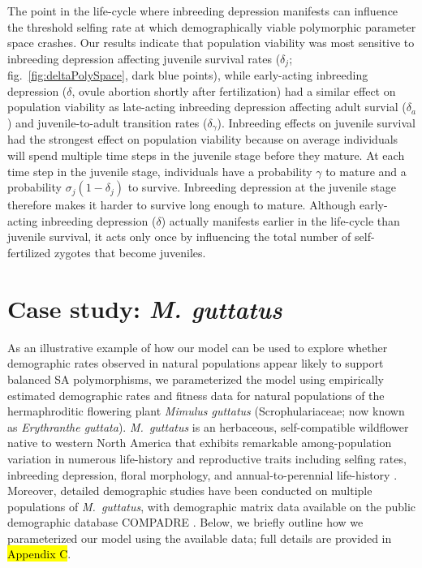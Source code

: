 \documentclass[11pt]{article}
\begin{document}
The point in the life-cycle where inbreeding depression manifests can influence the threshold selfing rate at which demographically viable polymorphic parameter space crashes. Our results indicate that population viability was most sensitive to inbreeding depression affecting juvenile survival rates ($\delta_j$; fig.~\ref{fig:deltaPolySpace}, dark blue points), while early-acting inbreeding depression ($\delta$, ovule abortion shortly after fertilization) had a similar effect on population viability as late-acting inbreeding depression affecting adult survial ($\delta_a$) and juvenile-to-adult transition rates ($\delta_{\gamma}$). Inbreeding effects on juvenile survival had the strongest effect on population viability because on average individuals will spend multiple time steps in the juvenile stage before they mature. At each time step in the juvenile stage, individuals have a probability $\gamma$ to mature and a probability $\sigma_j(1-\delta_j)$ to survive. Inbreeding depression at the juvenile stage therefore makes it harder to survive long enough to mature. Although early-acting inbreeding depression ($\delta$) actually manifests earlier in the life-cycle than juvenile survival, it acts only once by influencing the total number of self-fertilized zygotes that become juveniles.


\section*{Case study: {\itshape M. guttatus}}


As an illustrative example of how our model can be used to explore whether demographic rates observed in natural populations appear likely to support balanced SA polymorphisms, we parameterized the model using empirically estimated demographic rates and fitness data for natural populations of the hermaphroditic flowering plant {\itshape Mimulus guttatus} (Scrophulariaceae; now known as {\itshape Erythranthe guttata}). {\itshape M.~guttatus} is an herbaceous, self-compatible wildflower native to western North America that exhibits remarkable among-population variation in numerous life-history and reproductive traits including selfing rates, inbreeding depression, floral morphology, and annual-to-perennial life-history \citep[e.g.,][]{RitlandGanders1987, Ritland1990, Willis1993, Willis1999a, Willis1999b, WuWillis2008}. Moreover, detailed demographic studies have been conducted on multiple populations of {\itshape M.~guttatus}, with demographic matrix data available on the public demographic database COMPADRE \citep{CompadreDB2020}. Below, we briefly outline how we parameterized our model using the available data; full details are provided in \hl{Appendix C}.
\end{document}
